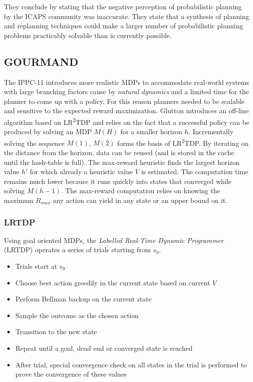 \documentclass[runningheads,a4paper]{llncs}
\begin{document}
They conclude by stating that the negative perception of probabilistic planning by the ICAPS community was inaccurate. They state that a synthesis of planning and replanning techniques could make a larger number of probabilistic planning problems practicably solvable than is currently possible.


\subsection{GOURMAND}

The IPPC-11 introduces more realistic MDPs to accommodate real-world systems with large branching factors cause by \emph{natural dynamics} and a limited time for the planner to come up with a policy. For this reason planners needed to be scalable and sensitive to the expected reward maximization. Glutton introduces an off-line algorithm based on LR\textsuperscript{2}TDP and relies on the fact that a successful policy can be produced by solving an MDP $M(H)$ for a smaller horizon $h$. Incrementally solving the sequence $M(1)$, $M(2)$ forms the basis of LR\textsuperscript{2}TDP\@. By iterating on the distance from the horizon, data can be reused (and is stored in the cache until the hash-table is full). The max-reward heuristic finds the largest horizon value $h'$ for which already a heuristic value $V$ is estimated. The  computation time remains much lower because it runs quickly into states that converged while solving $M(h-1)$. The max-reward computation relies on knowing the maximum $R_{max}$ any action can yield in any state or an upper bound on it.

\subsubsection{LRTDP}
Using goal oriented MDPs, the \emph{Labelled Real-Time Dynamic Programmer} (LRTDP) operates a series of trials starting from $s_0$.

\begin{itemize}
	\item Trials start at $s_0$
	\item Choose best action greedily in the current state based on current $V$
	\item Perform  Bellman backup on the current state
	\item Sample the outcome as the chosen action
	\item Transition to the new state
	\item Repeat until a goal, dead end or converged state is reached
	\item After trial, special convergence check on all states in the trial is performed to prove the convergence of these values
\end{itemize}
\end{document}
